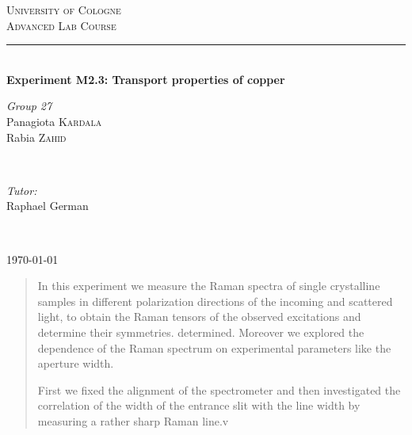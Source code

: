 \documentclass[openany,11pt,a4paper]{report}
\begin{document}
\pagestyle{empty}


\begin{titlepage}

\newcommand{\HRule}{\rule{\linewidth}{0.5mm}} 
\center 

\textsc{\LARGE University of Cologne}\\[1.5cm]
\textsc{\Large Advanced Lab Course}\\[0.5cm] 

\vfill


\HRule \\[0.4cm]
{\huge \textbf {Experiment M2.3:
Transport properties of copper}}

 
\vfill

\begin{minipage}{0.4\textwidth}
\begin{flushleft} \large
\emph{Group 27}\\
Panagiota \textsc{Kardala}\\
Rabia \textsc{Zahid}
 
\end{flushleft}
\end{minipage}
~
\begin{minipage}{0.4\textwidth}
\begin{flushright} \large
\emph{Tutor:} \\
{Raphael German } 
\end{flushright}
\end{minipage}\\[4cm]


\vfill

{\large \today}\\[3cm] 

\vfill

\end{titlepage}



\pagestyle{plain}

\tableofcontents







\begin{abstract}
In this experiment we measure the Raman spectra of single crystalline samples in different polarization directions of the incoming and scattered
light, to obtain the Raman tensors of the observed excitations and determine their symmetries. determined. Moreover we explored the dependence of
the Raman spectrum on experimental parameters like the aperture width.


 First we fixed the alignment of the
spectrometer and then investigated the correlation of the width of the entrance slit with the line width by measuring a
rather sharp Raman line.v
\end{abstract}
\end{document}
